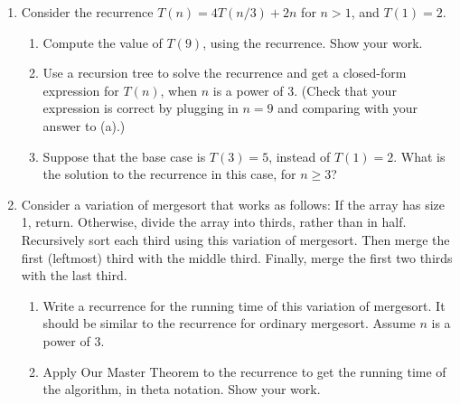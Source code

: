 \documentclass{article}
\begin{document}
\begin{enumerate}
    \item Consider the recurrence $T(n) = 4T(n/3) + 2n$ for $n > 1$, and $T(1) = 2$.
    \begin{enumerate}
        \item Compute the value of $T(9)$, using the recurrence. Show your work.
        \item Use a recursion tree to solve the recurrence and get a closed-form expression for $T(n)$, when $n$ is a power of 3. (Check that your expression is correct by plugging in $n = 9$ and comparing with your answer to (a).)
        \item Suppose that the base case is $T(3) = 5$, instead of $T(1) = 2$. What is the solution to the recurrence in this case, for $n \geq 3$?
    \end{enumerate}

    \item Consider a variation of mergesort that works as follows: If the array has size 1, return. Otherwise, divide the array into thirds, rather than in half. Recursively sort each third using this variation of mergesort. Then merge the first (leftmost) third with the middle third. Finally, merge the first two thirds with the last third.
    \begin{enumerate}
        \item Write a recurrence for the running time of this variation of mergesort. It should be similar to the recurrence for ordinary mergesort. Assume $n$ is a power of 3.
        \item Apply Our Master Theorem to the recurrence to get the running time of the algorithm, in theta notation. Show your work.
    \end{enumerate}


\end{enumerate}
\end{document}
